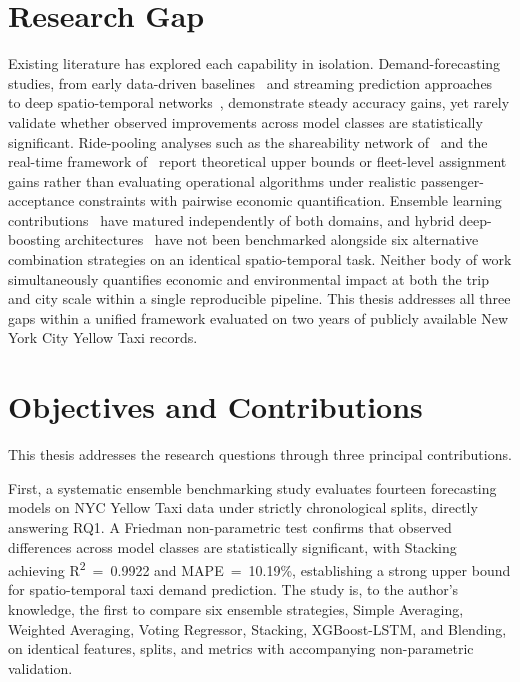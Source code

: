 \section{Research Gap}

Existing literature has explored each capability in isolation. Demand-forecasting studies, from early data-driven baselines~\parencite{dia2002object} and streaming prediction approaches~\parencite{moreira2013predicting} to deep spatio-temporal networks~\parencite{zhang2017deep,xu2017realtime,kim2020hybrid}, demonstrate steady accuracy gains, yet rarely validate whether observed improvements across model classes are statistically significant. Ride-pooling analyses such as the shareability network of~\parencite{santi2014quantifying} and the real-time framework of~\parencite{alonso2017demand} report theoretical upper bounds or fleet-level assignment gains rather than evaluating operational algorithms under realistic passenger-acceptance constraints with pairwise economic quantification. Ensemble learning contributions~\parencite{wolpert1992stacking,breiman2001rf,chen2016xgboost} have matured independently of both domains, and hybrid deep-boosting architectures~\parencite{zheng2020hybrid} have not been benchmarked alongside six alternative combination strategies on an identical spatio-temporal task. Neither body of work simultaneously quantifies economic and environmental impact at both the trip and city scale within a single reproducible pipeline. This thesis addresses all three gaps within a unified framework evaluated on two years of publicly available New York City Yellow Taxi records.

\section{Objectives and Contributions}

This thesis addresses the research questions through three principal contributions.

First, a systematic ensemble benchmarking study evaluates fourteen forecasting models on NYC Yellow Taxi data under strictly chronological splits, directly answering RQ1. A Friedman non-parametric test confirms that observed differences across model classes are statistically significant, with Stacking achieving R\textsuperscript{2}~=~0.9922 and MAPE~=~10.19\%, establishing a strong upper bound for spatio-temporal taxi demand prediction. The study is, to the author's knowledge, the first to compare six ensemble strategies, Simple Averaging, Weighted Averaging, Voting Regressor, Stacking, XGBoost-LSTM, and Blending, on identical features, splits, and metrics with accompanying non-parametric validation.

